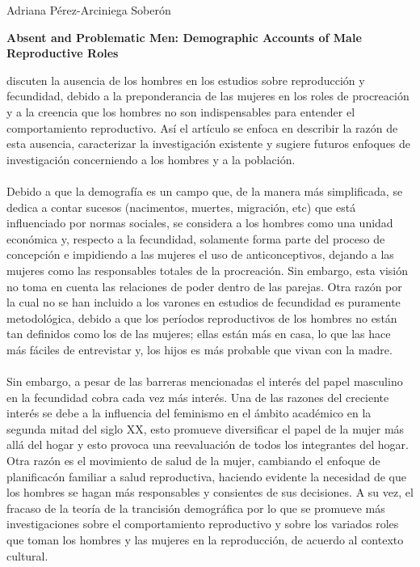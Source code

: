\documentclass[11pt,spanish,letterpaper]{article}
\theoremstyle{plain}
\begin{document}
\begin{flushleft}
Adriana P\'erez-Arciniega Sober\'on
\end{flushleft}
\begin{center}
\textbf{Absent and Problematic Men: Demographic Accounts of Male Reproductive Roles}
\end{center} 
\cite{greene2000absent} discuten la ausencia de los hombres en los estudios sobre reproducci\'on y fecundidad, debido a la preponderancia de las mujeres en los roles de procreaci\'on y a la creencia que los hombres no son indispensables para entender el comportamiento reproductivo. As\'i el art\'iculo se enfoca en describir la raz\'on de esta ausencia, caracterizar la investigaci\'on existente y sugiere futuros enfoques de investigaci\'on concerniendo a los hombres y a la poblaci\'on.\\
\\
Debido a que la demograf\'ia es un campo que, de la manera m\'as simplificada, se dedica a contar sucesos (nacimentos, muertes, migraci\'on, etc) que est\'a influenciado por normas sociales, se considera a los hombres como una unidad econ\'omica y, respecto a la fecundidad, solamente forma parte del proceso de concepci\'on e impidiendo a las mujeres el uso de anticonceptivos, dejando a las mujeres como las responsables totales de la procreaci\'on. Sin embargo, esta visi\'on no toma en cuenta las relaciones de poder dentro de las parejas. Otra raz\'on por la cual no se han incluido a los varones en estudios de fecundidad es puramente metodol\'ogica, debido a que los per\'iodos reproductivos de los hombres no est\'an tan definidos como los de las mujeres; ellas est\'an m\'as en casa, lo que las hace m\'as f\'aciles de entrevistar y, los hijos es m\'as probable que vivan con la madre.\\
\\
Sin embargo, a pesar de las barreras mencionadas el inter\'es del papel masculino en la fecundidad cobra cada vez m\'as inter\'es. Una de las razones del creciente inter\'es se debe a la influencia del feminismo en el \'ambito acad\'emico en la segunda mitad del siglo XX, esto promueve diversificar el papel de la mujer m\'as all\'a del hogar y esto provoca una reevaluaci\'on de todos los integrantes del hogar. Otra raz\'on es el movimiento de salud de la mujer, cambiando el enfoque de planificac\'on familiar a salud reproductiva, haciendo evidente la necesidad de que los hombres se hagan m\'as responsables y consientes de sus decisiones. A su vez, el fracaso de la teor\'ia de la trancisi\'on demogr\'afica por lo que se promueve m\'as investigaciones sobre el comportamiento reproductivo y sobre los variados roles que toman los hombres y las mujeres en la reproducci\'on, de acuerdo al contexto cultural.\\
\end{document}
